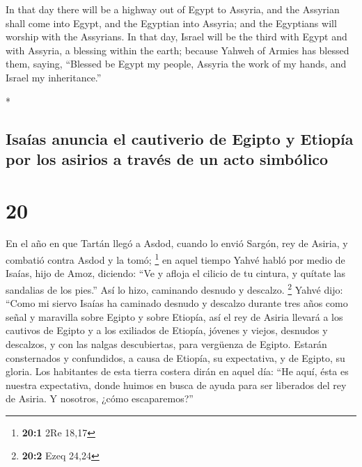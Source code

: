 \begin{paracol}{2}
\begin{otherlanguage}{english}
 In that day there will be a highway out of Egypt to
Assyria, and the Assyrian shall come into Egypt, and the Egyptian into
Assyria; and the Egyptians will worship with the Assyrians.
 In that day, Israel will be the third with Egypt and
with Assyria, a blessing within the earth;  because
Yahweh of Armies has blessed them, saying, ``Blessed be Egypt my people,
Assyria the work of my hands, and Israel my inheritance.''

\end{otherlanguage}

\switchcolumn[0]*

\hypertarget{isauxedas-anuncia-el-cautiverio-de-egipto-y-etiopuxeda-por-los-asirios-a-travuxe9s-de-un-acto-simbuxf3lico}{%
\subsection{Isaías anuncia el cautiverio de Egipto y Etiopía por los
asirios a través de un acto
simbólico}\label{isauxedas-anuncia-el-cautiverio-de-egipto-y-etiopuxeda-por-los-asirios-a-travuxe9s-de-un-acto-simbuxf3lico}}

\hypertarget{section-38}{%
\section{20}\label{section-38}}

 En el año en que Tartán llegó a Asdod, cuando lo envió
Sargón, rey de Asiria, y combatió contra Asdod y la tomó; \footnote{\textbf{20:1}
  2Re 18,17}  en aquel tiempo Yahvé habló por medio de
Isaías, hijo de Amoz, diciendo: ``Ve y afloja el cilicio de tu cintura,
y quítate las sandalias de los pies.'' Así lo hizo, caminando desnudo y
descalzo. \footnote{\textbf{20:2} Ezeq 24,24}  Yahvé dijo:
``Como mi siervo Isaías ha caminado desnudo y descalzo durante tres años
como señal y maravilla sobre Egipto y sobre Etiopía,  así
el rey de Asiria llevará a los cautivos de Egipto y a los exiliados de
Etiopía, jóvenes y viejos, desnudos y descalzos, y con las nalgas
descubiertas, para vergüenza de Egipto.  Estarán
consternados y confundidos, a causa de Etiopía, su expectativa, y de
Egipto, su gloria.  Los habitantes de esta tierra costera
dirán en aquel día: ``He aquí, ésta es nuestra expectativa, donde huimos
en busca de ayuda para ser liberados del rey de Asiria. Y nosotros,
¿cómo escaparemos?''


\end{paracol}
